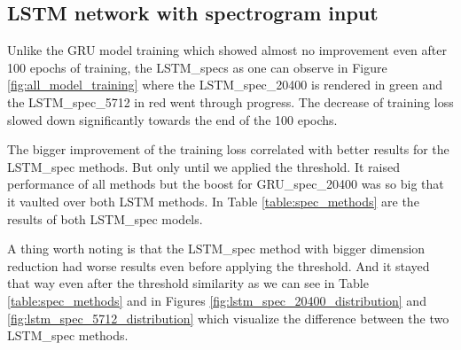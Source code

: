\subsection{LSTM network with spectrogram input}\label{ssec:LSTM_spec_results}

Unlike the GRU model training which showed almost no improvement even after 100 epochs of training, the LSTM\_specs as one can observe in Figure \ref{fig:all_model_training} where the LSTM\_spec\_20400 is rendered in green and the LSTM\_spec\_5712 in red went through progress. The decrease of training loss slowed down significantly towards the end of the 100 epochs.

The bigger improvement of the training loss correlated with better results for the LSTM\_spec methods. But only until we applied the threshold. It raised performance of all methods but the boost for GRU\_spec\_20400 was so big that it vaulted over both LSTM methods. In Table \ref{table:spec_methods} are the results of both LSTM\_spec models. 

A thing worth noting is that the LSTM\_spec method with bigger dimension reduction had worse results even before applying the threshold. And it stayed that way even after the threshold similarity as we can see in Table \ref{table:spec_methods} and in Figures \ref{fig:lstm_spec_20400_distribution} and \ref{fig:lstm_spec_5712_distribution} which visualize the difference between the two LSTM\_spec methods.


